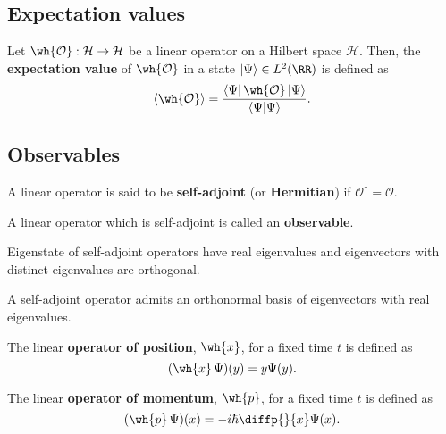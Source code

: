 \documentclass[12pt, a4paper]{article}
\begin{document}
\subsection{Expectation values}

\begin{mdthm}
    Let \(\wh{\mathcal{O}} : \mathcal{H} \to \mathcal{H}\) be a linear operator on a Hilbert space \(\mathcal{H}\). Then, the \textbf{expectation value} of \(\wh{\mathcal{O}} \) in a state \(\ket{\Psi} \in L^2(\RR)\) is defined as 
    \[\langle \wh{\mathcal{O}}  \rangle = \frac{\bra{\Psi} \wh{\mathcal{O}} \ket{\Psi}}{\bra{\Psi} \ket{\Psi}}.\]
\end{mdthm}

\subsection{Observables}

\begin{definition}
    A linear operator is said to be \textbf{self-adjoint} (or \textbf{Hermitian}) if \(\mathcal{O}^{\dagger}=\mathcal{O}\).
\end{definition}

\begin{definition}
    A linear operator which is self-adjoint is called an \textbf{observable}.
\end{definition}

\begin{theorem}
    Eigenstate of self-adjoint operators have real eigenvalues and eigenvectors with distinct eigenvalues are orthogonal.
\end{theorem}

\begin{mdthm}
    A self-adjoint operator admits an orthonormal basis of eigenvectors with real \\ eigenvalues.
\end{mdthm}

\begin{definition}
    The linear \textbf{operator of position}, \(\wh{x}\), for a fixed time \(t\) is defined as 
    \[(\wh{x} \, \Psi)(y) = y\Psi(y).\]
\end{definition}

\begin{definition}
    The linear \textbf{operator of momentum}, \(\wh{p}\), for a fixed time \(t\) is defined as 
    \[(\wh{p} \, \Psi)(x) = - i\hbar \diffp{}{x} \Psi(x).\]
\end{definition}
\end{document}
